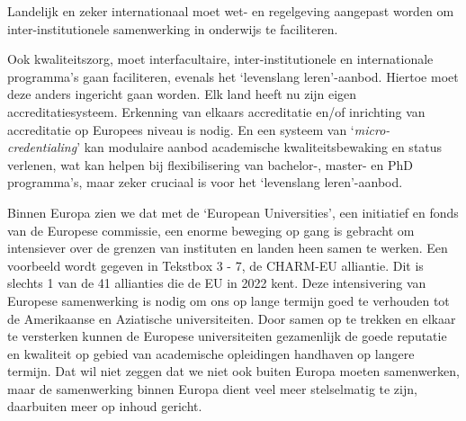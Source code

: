\documentclass[smallauthor, chapterhaspagenum, nochapterinheader, pagenuminheader,  bigchapnum,medium2, tocpages,  garamond, titleinheader]{jote-book}
\begin{document}
	Landelijk en zeker internationaal moet wet- en regelgeving aangepast worden om inter-institutionele samenwerking in onderwijs te faciliteren.



	Ook kwaliteitszorg, moet interfacultaire, inter-institutionele en internationale programma's gaan faciliteren, evenals het ‘levenslang leren'-aanbod. Hiertoe moet deze anders ingericht gaan worden. Elk land heeft nu zijn eigen accreditatiesysteem. Erkenning van elkaars accreditatie en/of inrichting van accreditatie op Europees niveau is nodig. En een systeem van ‘\emph{micro-}\emph{credentialing}' kan modulaire aanbod academische kwaliteitsbewaking en status verlenen, wat kan helpen bij flexibilisering van bachelor-, master- en PhD programma's, maar zeker cruciaal is voor het ‘levenslang leren'-aanbod.



	Binnen Europa zien we dat met de ‘European Universities', een initiatief en fonds van de Europese commissie, een enorme beweging op gang is gebracht om intensiever over de grenzen van instituten en landen heen samen te werken. Een voorbeeld wordt gegeven in Tekstbox 3 - 7, de CHARM-EU alliantie. Dit is slechts 1 van de 41 allianties die de EU in 2022 kent. Deze intensivering van Europese samenwerking is nodig om ons op lange termijn goed te verhouden tot de Amerikaanse en Aziatische universiteiten. Door samen op te trekken en elkaar te versterken kunnen de Europese universiteiten gezamenlijk de goede reputatie en kwaliteit op gebied van academische opleidingen handhaven op langere termijn. Dat wil niet zeggen dat we niet ook buiten Europa moeten samenwerken, maar de samenwerking binnen Europa dient veel meer stelselmatig te zijn, daarbuiten meer op inhoud gericht.
\end{document}
